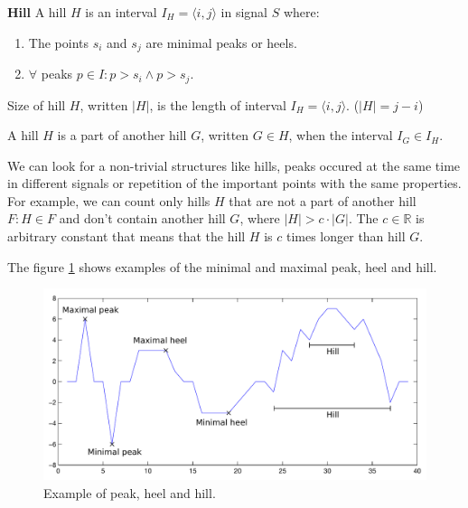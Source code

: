 \begin{definition}{\textbf{Hill}}
	\label{def:hill}
	A hill $H$ is an interval $I_H = \langle i,j \rangle$ in signal $S$ where:
	\begin{enumerate}
		\item The points $s_i$ and $s_j$ are minimal peaks or heels.
		\item $\forall$ peaks $p \in I : p > s_i \land p > s_j$.
	\end{enumerate}
\end{definition}

\begin{remark}
	Size of hill $H$, written $|H|$, is the length of interval $I_H = \langle i,j \rangle$. ($|H| = j - i$)
\end{remark}

\begin{remark}
	A hill $H$ is a part of another hill $G$, written $G \in H$, when the interval $I_G \in I_H$.
\end{remark}

We can look for a non-trivial structures like hills, peaks occured at the same time in different signals or repetition of the important points with the same properties. For example, we can count only hills $H$ that are not a part of another hill $F : H \in F$ and don't contain another hill $G$, where $|H| > c \cdot |G|$. The $c \in \mathbb{R}$ is arbitrary constant that means that the hill $H$ is $c$ times longer than hill $G$.

The figure \ref{fig:peakHeelHill} shows examples of the minimal and maximal peak, heel and hill.

\begin{figure}
	\centering
	\label{fig:peakHeelHill}
	\caption{Example of peak, heel and hill.}
	\includegraphics[width=\linewidth]{img/peakHeelHillExample.pdf}
\end{figure}

